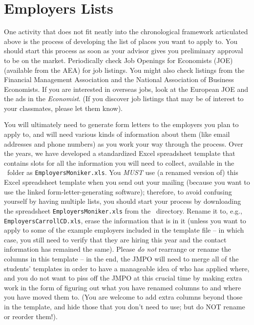 \documentclass{\classes/econtex}
\begin{document}
\section{Employers Lists}\hypertarget{below}{}
One activity that does not fit neatly into the chronological framework
articulated above is the process of developing the list of places you
want to apply to.  You should start this process as soon as your
advisor gives you preliminary approval to be on the market.
Periodically check Job Openings for Economists (JOE) (available from
the AEA) for job listings.  You might also check listings from the
Financial Management Association and the National Association of
Business Economists.  If you are interested in overseas jobs, look at
the European JOE and the ads in the \textit{Economist}.  (If you discover
job listings that may be of interest to your classmates, please let
them know).

You will ultimately need to generate form letters to the employers you
plan to apply to, and will need various kinds of information about
them (like email addresses and phone numbers) as you work your way
through the process.  Over the years, we have developed a standardized
Excel spreadsheet template that contains slots for all the information
you will need to collect, available in the \Templates~folder as
\texttt{EmployersMoniker.xls}.  You \textit{MUST} use (a renamed version
of) this Excel spreadsheet template when you send out your mailing
(because you want to use the linked form-letter-generating software);
therefore, to avoid confusing yourself by having multiple lists, you
should start your process by downloading the spreadsheet
\texttt{EmployersMoniker.xls} from the \Templates~directory.  Rename
it to, e.g., \texttt{EmployersCarrollCD.xls}, erase the information
that is in it (unless you want to apply to some of the example
employers included in the template file -- in which case, you still
need to verify that they are hiring this year and the contact
information has remained the same).  Please \textit{do not} rearrange or
rename the columns in this template -- in the end, the JMPO will need
to merge all of the students' templates in order to have a manageable
idea of who has applied where, and you do not want to piss off the
JMPO at this crucial time by making extra work in the form of figuring
out what you have renamed columns to and where you have moved them to.
(You are welcome to add extra columns beyond those in the template,
and hide those that you don't need to use; but do NOT rename or
reorder them!).
\end{document}
